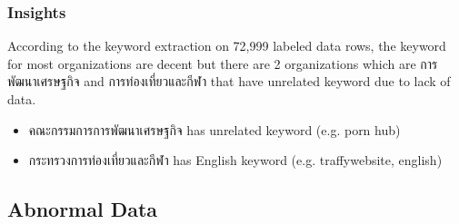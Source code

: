 \documentclass[12pt, a4paper]{article}
\begin{document}
                \subsubsection{Insights}
                    According to the keyword extraction on 72,999 labeled data rows, the keyword for most
                    organizations are decent but there are 2 organizations which are การพัฒนาเศรษฐกิจ and การท่องเที่ยวและกีฬา
                    that have unrelated keyword due to lack of data.
                    \begin{itemize}
                        \item คณะกรรมการการพัฒนาเศรษฐกิจ has unrelated keyword (e.g. porn hub)
                        \item กระทรวงการท่องเที่ยวและกีฬา has English keyword (e.g. traffywebsite, english)
                    \end{itemize}

    \pagebreak

            \subsection{Abnormal Data}
\end{document}
